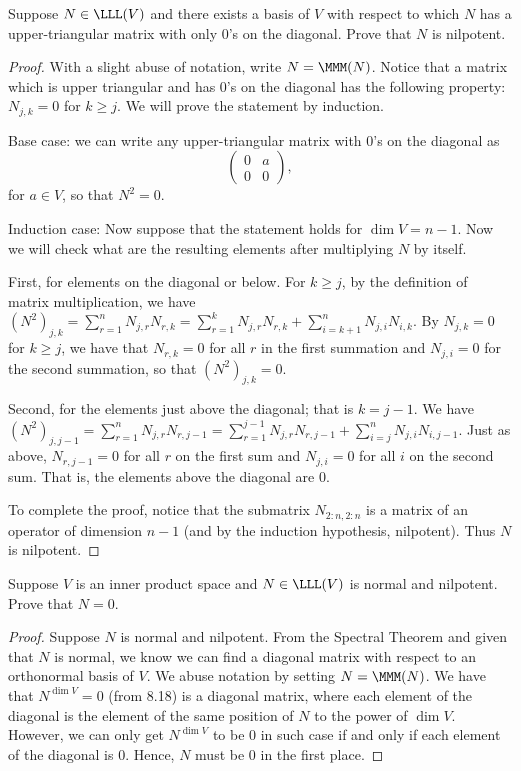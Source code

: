 \begin{exercise}{12}
  Suppose $N\in\LLL(V)$ and there exists a basis of $V$ with respect to which $N$ has a upper-triangular matrix with only 0's on the diagonal.  Prove that $N$ is nilpotent.
\end{exercise}
\begin{proof}
 With a slight abuse of notation, write $N=\MMM(N)$. Notice that a matrix which is upper triangular and has 0's on the diagonal has the following property: $N_{j,k}=0$ for $k\geq j$. We will prove the statement by induction. 

 Base case: we can write any upper-triangular matrix with 0's on the diagonal as
 \[
 \begin{pmatrix}
     0 & a\\
     0 & 0
 \end{pmatrix},
 \]
 for $a\in V$, so that $N^2=0$.

 Induction case: Now suppose that the statement holds for $\dim V=n-1$. Now we will check what are the resulting elements after multiplying $N$ by itself. 
 
 First, for elements on the diagonal or below. For $k\geq j$, by the definition of matrix multiplication, we have $(N^2)_{j,k} =\sum_{r=1}^nN_{j,r}N_{r,k} =\sum_{r=1}^kN_{j,r}N_{r,k}+\sum_{i=k+1}^nN_{j,i}N_{i,k}$. By $N_{j,k}=0$ for $k\geq j$, we have that $N_{r,k}=0$ for all $r$ in the first summation and $N_{j,i}=0$ for the second summation, so that $(N^2)_{j,k}=0$.

 Second, for the elements just above the diagonal; that is $k= j-1$. We have $(N^2)_{j,j-1} =\sum_{r=1}^nN_{j,r}N_{r,j-1} =\sum_{r=1}^{j-1}N_{j,r}N_{r,j-1}+\sum_{i=j}^nN_{j,i}N_{i,j-1}$. Just as above, $N_{r,j-1}=0$ for all $r$ on the first sum and $N_{j,i}=0$ for all $i$ on the second sum. That is, the elements above the diagonal are 0.

 To complete the proof, notice that the submatrix $N_{2:n,2:n}$ is a matrix of an operator of dimension $n-1$ (and by the induction hypothesis, nilpotent). Thus $N$ is nilpotent.
\end{proof}

\begin{exercise}{13}
  Suppose $V$ is an inner product space and $N\in\LLL(V)$ is normal and nilpotent. Prove that $N=0$.
\end{exercise}
\begin{proof}
 Suppose $N$ is normal and nilpotent. From the Spectral Theorem and given that $N$ is normal, we know we can find a diagonal matrix with respect to an orthonormal basis of $V$. We abuse notation by setting $N=\MMM(N)$. We have that $N^{\dim V}=0$ (from 8.18) is a diagonal matrix, where each element of the diagonal is the element of the same position of $N$ to the power of $\dim V$. However, we can only get $N^{\dim V}$ to be 0 in such case if and only if each element of the diagonal is 0. Hence, $N$ must be 0 in the first place.
\end{proof}

